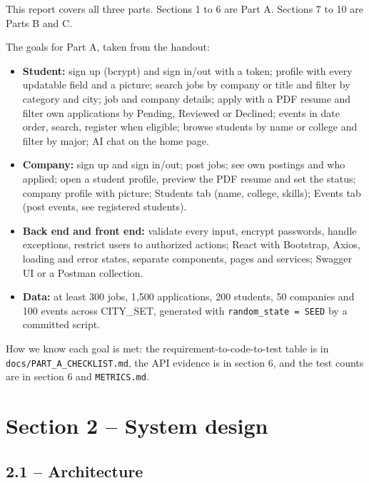 \documentclass[11pt,letterpaper]{article}
\newcommand{\code}[1]{\texttt{#1}}
\begin{document}
This report covers all three parts. Sections 1 to 6 are Part A. Sections 7 to 10 are Parts B and C.

The goals for Part A, taken from the handout:

\begin{itemize}
\item \textbf{Student:} sign up (bcrypt) and sign in/out with a token; profile with every updatable field and a picture; search jobs by company or title and filter by category and city; job and company details; apply with a PDF resume and filter own applications by Pending, Reviewed or Declined; events in date order, search, register when eligible; browse students by name or college and filter by major; AI chat on the home page.
\item \textbf{Company:} sign up and sign in/out; post jobs; see own postings and who applied; open a student profile, preview the PDF resume and set the status; company profile with picture; Students tab (name, college, skills); Events tab (post events, see registered students).
\item \textbf{Back end and front end:} validate every input, encrypt passwords, handle exceptions, restrict users to authorized actions; React with Bootstrap, Axios, loading and error states, separate components, pages and services; Swagger UI or a Postman collection.
\item \textbf{Data:} at least 300 jobs, 1,500 applications, 200 students, 50 companies and 100 events across CITY\_SET, generated with \code{random\_\allowbreak{}state =\allowbreak{} SEED} by a committed script.
\end{itemize}

How we know each goal is met: the requirement-to-code-to-test table is in \code{docs/\allowbreak{}PART\_\allowbreak{}A\_\allowbreak{}CHECKLIST.\allowbreak{}md}, the API evidence is in section 6, and the test counts are in section 6 and \code{METRICS.\allowbreak{}md}.

\section*{Section 2 -- System design}

\subsection*{2.1 -- Architecture}
\end{document}

